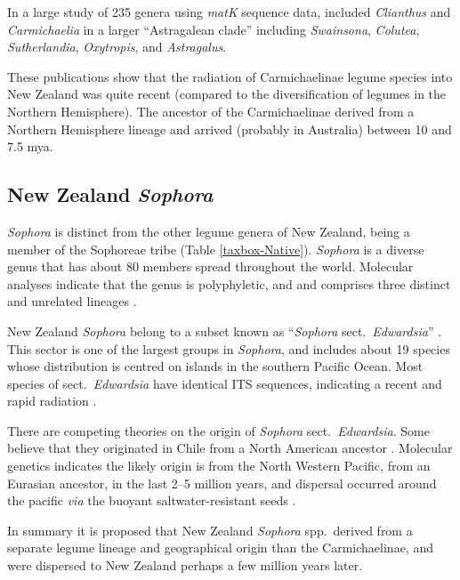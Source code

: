 In a large study of 235 genera using \emph{matK} sequence data,
\citet{Wojciechowski04} included \emph{Clianthus} and
\emph{Carmichaelia} in a larger ``Astragalean clade'' including
\emph{Swainsona}, \emph{Colutea}, \emph{Sutherlandia},
\emph{Oxytropis}, and \emph{Astragalus}.

These publications show that the radiation of Carmichaelinae legume
species into New Zealand was quite recent (compared to the
diversification of legumes in the Northern Hemisphere). The ancestor
of the Carmichaelinae derived from a Northern Hemisphere lineage and
arrived (probably in Australia) between 10 and 7.5 mya.


\subsection{New Zealand \emph{Sophora}}

\emph{Sophora} is distinct from the other legume genera of New
Zealand, being a member of the Sophoreae tribe (Table
\ref{taxbox-Native}). \emph{Sophora} is a diverse genus that has
about 80 members spread throughout the world. Molecular analyses
indicate that the genus is polyphyletic, and and comprises three
distinct and unrelated lineages
\citep{Kass95,Kass96,Crisp00,Pennington01}.

New Zealand \emph{Sophora} belong to a subset known as
``\emph{Sophora} sect.~\emph{Edwardsia}'' \citep{Kass97,Heenan04}.
This sector is one of the largest groups in \emph{Sophora}, and
includes about 19 species whose distribution is centred on islands
in the southern Pacific Ocean. Most species of
sect.~\emph{Edwardsia} have identical  ITS sequences, indicating a
recent and rapid radiation \citep{Mitchell02}.

There are competing theories on the origin of \emph{Sophora}
sect.~\emph{Edwardsia}. Some believe that they originated in Chile
from a North American ancestor \citep{Sykes68,Pena00}. Molecular
genetics indicates the likely origin is from the North Western
Pacific, from an Eurasian ancestor, in the last 2--5 million years,
and dispersal occurred around the pacific \emph{via} the buoyant
saltwater-resistant seeds \citep{Hurr99,Mitchell02,Heenan04}.

In summary it is proposed that New Zealand \emph{Sophora}
spp.~derived from a separate legume lineage and geographical origin
than the Carmichaelinae, and were dispersed to New Zealand perhaps a
few million years later.




